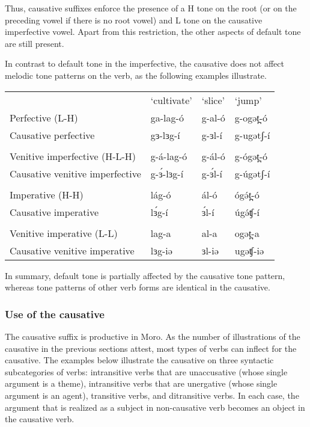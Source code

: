 Thus, causative suffixes enforce the presence of a H tone on the root (or on the preceding vowel if there is no root vowel) and L tone on the causative imperfective vowel.  Apart from this restriction, the other aspects of default tone are still present.

In contrast to default tone in the imperfective, the causative does not affect melodic tone patterns on the verb, as the following examples illustrate. 

\ea
\begin{tabular}[t]{llll}
& `cultivate' & `slice' & `jump' \\
Perfective (L-H) 			&	ga-lag-ó	&	g-al-ó	&	g-ogət̪-ó	\\
Causative perfective &	gɜ-lɜg-í	&	g-ɜl-í	&	g-ugətʃ-í\\
& \\
Venitive imperfective (H-L-H)  &	g-á-lag-ó	&	g-ál-ó	&	g-ógət̪-ó\\
Causative venitive imperfective	&	g-ɜ́-lɜg-í	&	g-ɜ́l-í	&	g-úgətʃ-í\\
& \\
Imperative (H-H)	&	lág-ó		&	ál-ó		&	ógə́t̪-ó \\
Causative imperative		&	lɜ́g-í		&	ɜ́l-í	&	úgə́ʧ-í\\
& \\
Venitive imperative (L-L)		&	lag-a		&	al-a		&	ogət̪-a \\
Causative venitive imperative	&	lɜg-iə		&	ɜl-iə	&	ugəʧ-iə\\
\end{tabular}
\z 

In summary, default tone is partially affected by the causative tone pattern, whereas tone patterns of other verb forms are identical in the causative. 


\subsubsection{Use of the causative}\label{sec:ch11:caususe}

The causative suffix is productive in Moro. As the number of illustrations of the causative in the previous sections attest, most types of verbs can inflect for the causative. The examples below illustrate the causative on three syntactic subcategories of verbs: intransitive verbs that are unaccusative (whose single argument is a theme), intransitive verbs that are unergative (whose single argument is an agent), transitive verbs, and ditransitive verbs. In each case, the argument that is realized as a subject in non-causative verb becomes an object in the causative verb. 

